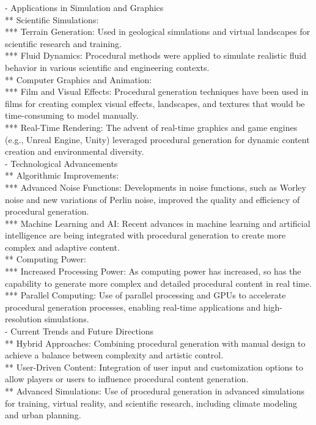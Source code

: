 - Applications in Simulation and Graphics \\
** Scientific Simulations: \\
*** Terrain Generation: Used in geological simulations and virtual landscapes for scientific research and training. \\
*** Fluid Dynamics: Procedural methods were applied to simulate realistic fluid behavior in various scientific and engineering contexts. \\
** Computer Graphics and Animation: \\
*** Film and Visual Effects: Procedural generation techniques have been used in films for creating complex visual effects, landscapes, and textures that would be time-consuming to model manually. \\
*** Real-Time Rendering: The advent of real-time graphics and game engines (e.g., Unreal Engine, Unity) leveraged procedural generation for dynamic content creation and environmental diversity. \\
- Technological Advancements \\
** Algorithmic Improvements: \\
*** Advanced Noise Functions: Developments in noise functions, such as Worley noise and new variations of Perlin noise, improved the quality and efficiency of procedural generation. \\
*** Machine Learning and AI: Recent advances in machine learning and artificial intelligence are being integrated with procedural generation to create more complex and adaptive content. \\
** Computing Power: \\
*** Increased Processing Power: As computing power has increased, so has the capability to generate more complex and detailed procedural content in real time. \\
*** Parallel Computing: Use of parallel processing and GPUs to accelerate procedural generation processes, enabling real-time applications and high-resolution simulations. \\
- Current Trends and Future Directions \\
** Hybrid Approaches: Combining procedural generation with manual design to achieve a balance between complexity and artistic control. \\
** User-Driven Content: Integration of user input and customization options to allow players or users to influence procedural content generation. \\
** Advanced Simulations: Use of procedural generation in advanced simulations for training, virtual reality, and scientific research, including climate modeling and urban planning. 


